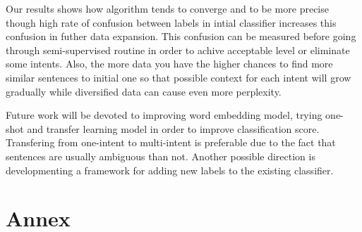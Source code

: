\documentclass[11pt]{article}
\begin{document}
Our results shows how algorithm tends to converge and to be more precise though high rate of confusion between labels in intial classifier increases this confusion in futher data expansion. This confusion can be measured before going through semi-supervised routine in order to achive acceptable level or eliminate some intents. Also, the more data you have the higher chances to find more similar sentences to initial one so that possible context for each intent will grow gradually while diversified data can cause even more perplexity.

Future work will be devoted to improving word embedding model, trying one-shot and transfer learning model in order to improve classification score. Transfering from one-intent to multi-intent is preferable due to the fact that sentences are usually ambiguous than not. Another possible direction is developmenting a framework for adding new labels to the existing classifier.





\section{Annex}
\end{document}
